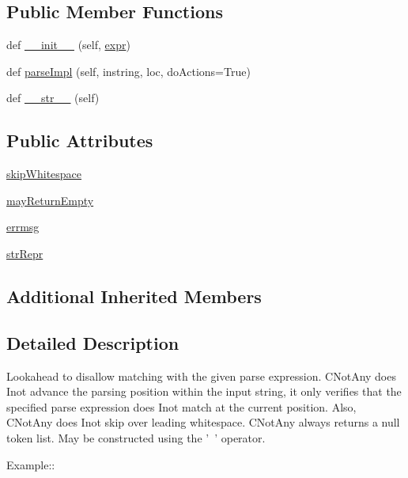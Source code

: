 \subsection*{Public Member Functions}
\begin{DoxyCompactItemize}
\item 
def \hyperlink{classpkg__resources_1_1__vendor_1_1pyparsing_1_1NotAny_a9dfc8ab73a6f40dd44ca806a7a491858}{\+\_\+\+\_\+init\+\_\+\+\_\+} (self, \hyperlink{classpkg__resources_1_1__vendor_1_1pyparsing_1_1ParseElementEnhance_a34e02b3404b2a545ca1be8b522758896}{expr})
\item 
def \hyperlink{classpkg__resources_1_1__vendor_1_1pyparsing_1_1NotAny_a5c07b367f56687282310bd48160a18a7}{parse\+Impl} (self, instring, loc, do\+Actions=True)
\item 
def \hyperlink{classpkg__resources_1_1__vendor_1_1pyparsing_1_1NotAny_a9b69c9eb2f6b01529a0c7dfe640c5aaf}{\+\_\+\+\_\+str\+\_\+\+\_\+} (self)
\end{DoxyCompactItemize}
\subsection*{Public Attributes}
\begin{DoxyCompactItemize}
\item 
\hyperlink{classpkg__resources_1_1__vendor_1_1pyparsing_1_1NotAny_a2d784a8cff65a02f83e5a09260be4e4a}{skip\+Whitespace}
\item 
\hyperlink{classpkg__resources_1_1__vendor_1_1pyparsing_1_1NotAny_ac4911132cd1f8d5ef6f2d1ea9fea3ceb}{may\+Return\+Empty}
\item 
\hyperlink{classpkg__resources_1_1__vendor_1_1pyparsing_1_1NotAny_a2eb4d57decb5dcc9aa829e6474c4f922}{errmsg}
\item 
\hyperlink{classpkg__resources_1_1__vendor_1_1pyparsing_1_1NotAny_abd001e6feccd91326d61da128ec4ccb5}{str\+Repr}
\end{DoxyCompactItemize}
\subsection*{Additional Inherited Members}


\subsection{Detailed Description}
\begin{DoxyVerb}Lookahead to disallow matching with the given parse expression.  C{NotAny}
does I{not} advance the parsing position within the input string, it only
verifies that the specified parse expression does I{not} match at the current
position.  Also, C{NotAny} does I{not} skip over leading whitespace. C{NotAny}
always returns a null token list.  May be constructed using the '~' operator.

Example::\end{DoxyVerb}
 

